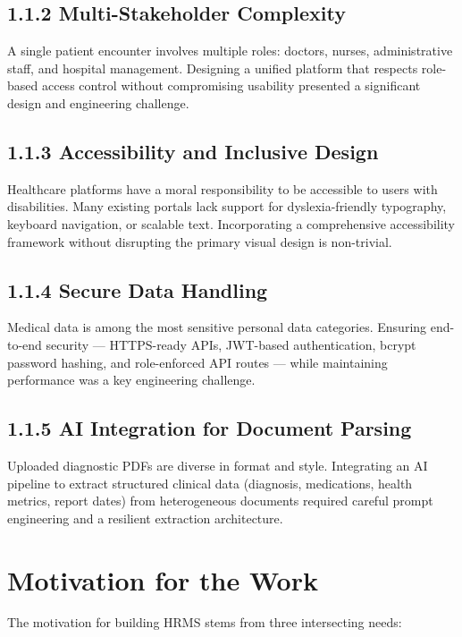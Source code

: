 \documentclass[12pt,a4paper]{report}
\begin{document}
\subsection{1.1.2 Multi-Stakeholder Complexity}
A single patient encounter involves multiple roles: doctors, nurses, administrative staff, and hospital management. Designing a unified platform that respects role-based access control without compromising usability presented a significant design and engineering challenge.

\subsection{1.1.3 Accessibility and Inclusive Design}
Healthcare platforms have a moral responsibility to be accessible to users with disabilities. Many existing portals lack support for dyslexia-friendly typography, keyboard navigation, or scalable text. Incorporating a comprehensive accessibility framework without disrupting the primary visual design is non-trivial.

\subsection{1.1.4 Secure Data Handling}
Medical data is among the most sensitive personal data categories. Ensuring end-to-end security — HTTPS-ready APIs, JWT-based authentication, bcrypt password hashing, and role-enforced API routes — while maintaining performance was a key engineering challenge.

\subsection{1.1.5 AI Integration for Document Parsing}
Uploaded diagnostic PDFs are diverse in format and style. Integrating an AI pipeline to extract structured clinical data (diagnosis, medications, health metrics, report dates) from heterogeneous documents required careful prompt engineering and a resilient extraction architecture.

\section{Motivation for the Work}

The motivation for building HRMS stems from three intersecting needs:
\end{document}
